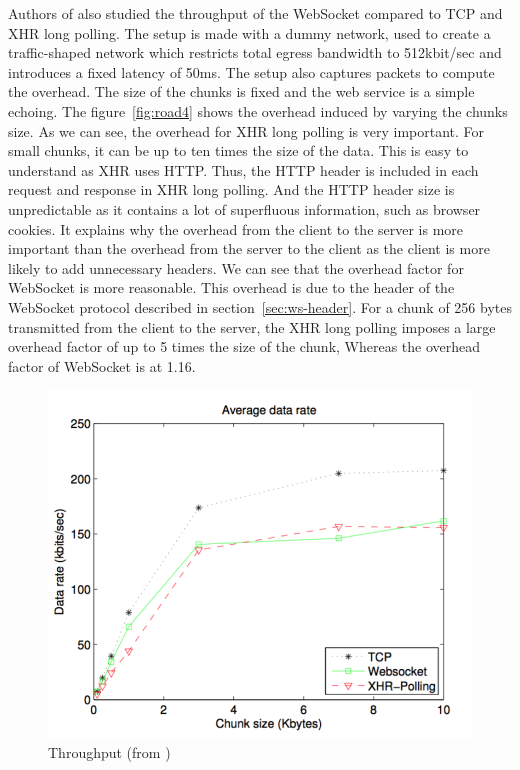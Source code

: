 \documentclass[10pt,journal,compsoc]{IEEEtran}
\newcommand{\ws}{WebSocket}
\begin{document}
Authors of \cite{roadblock} also studied the throughput of the \ws{} compared to TCP and XHR long polling.
The setup is made with a dummy network, used to create a traffic-shaped network which restricts total egress bandwidth to 512kbit/sec and introduces a fixed latency of 50ms.
The setup also captures packets to compute the overhead.
The size of the chunks is fixed and the web service is a simple echoing.
The figure~\ref{fig:road4} shows the overhead induced by varying the chunks size. %
As we can see, the overhead for XHR long polling is very important.
For small chunks, it can be up to ten times the size of the data. %
This is easy to understand as XHR uses HTTP.
Thus, the HTTP header is included in each request and response in XHR long polling.
And the HTTP header size is unpredictable as it contains a lot of superfluous information, such as browser cookies. %
It explains why the overhead from the client to the server is more important than the overhead from the server to the client as the client is more likely to add unnecessary headers.
We can see that the overhead factor for \ws{} is more reasonable.
This overhead is due to the header of the \ws{} protocol described in section~\ref{sec:ws-header}.
For a chunk of 256 bytes transmitted from the client to the server, the XHR long polling imposes a large overhead factor of up to 5 times the size of the chunk, Whereas the overhead factor of \ws{} is at 1.16. %

\begin{figure}[!ht]
    \centering
    \includegraphics[width=\linewidth]{road3.png}
    \caption{Throughput (from \cite{roadblock})}
    \label{fig:road3}
\end{figure}
\end{document}
